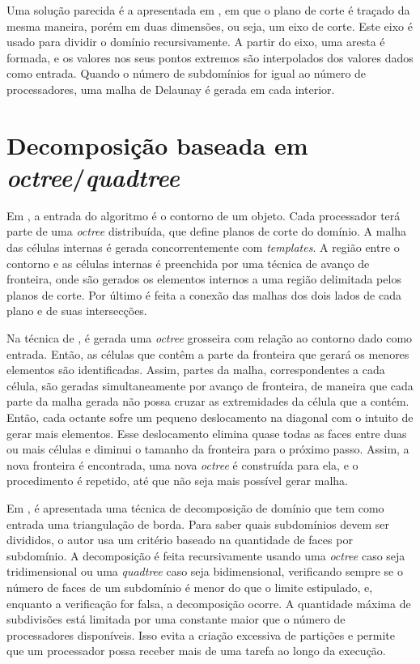 Uma solução parecida é a apresentada em \cite{bib:Lammer00}, em que o plano de corte é traçado da mesma maneira, porém em duas dimensões, ou seja, um eixo de corte. Este eixo é usado para dividir o domínio recursivamente. A partir do eixo, uma aresta é formada, e os valores nos seus pontos extremos são interpolados dos valores dados como entrada. Quando o número de subdomínios for igual ao número de processadores, uma malha de Delaunay é gerada em cada interior.

\section{Decomposição baseada em \textit{octree}/\textit{quadtree}}

Em \cite{bib:deCougny99}, a entrada do algoritmo é o contorno de um objeto. Cada processador terá parte de uma \textit{octree} distribuída, que define planos de corte do domínio. A malha das células internas é gerada concorrentemente com \textit{templates}. A região entre o contorno e as células internas é preenchida por uma técnica de avanço de fronteira, onde são gerados os elementos internos a uma região delimitada pelos planos de corte. Por último é feita a conexão das malhas dos dois lados de cada plano e de suas intersecções.

Na técnica de \cite{bib:Lohner01}, é gerada uma \textit{octree} grosseira com relação ao contorno dado como entrada. Então, as células que contêm a parte da fronteira que gerará os menores elementos são identificadas. Assim, partes da malha, correspondentes a cada célula, são geradas simultaneamente por avanço de fronteira, de maneira que cada parte da malha gerada não possa cruzar as extremidades da célula que a contém. Então, cada octante sofre um pequeno deslocamento na diagonal com o intuito de gerar mais elementos. Esse deslocamento elimina quase todas as faces entre duas ou mais células e diminui o tamanho da fronteira para o próximo passo. Assim, a nova fronteira é encontrada, uma nova \textit{octree} é construída para ela, e o procedimento é repetido, até que não seja mais possível gerar malha.

Em \cite{bib:Larwood03}, é apresentada uma técnica de decomposição de domínio que tem como entrada uma triangulação de borda. Para saber quais subdomínios devem ser divididos, o autor usa um critério baseado na quantidade de faces por subdomínio. A decomposição é feita recursivamente usando uma \textit{octree} caso seja tridimensional ou uma \textit{quadtree} caso seja bidimensional, verificando sempre se o número de faces de um subdomínio é menor do que o limite estipulado, e, enquanto a verificação for falsa, a decomposição ocorre. A quantidade máxima de subdivisões está limitada por uma constante maior que o número de processadores disponíveis. Isso evita a criação excessiva de partições e permite que um processador possa receber mais de uma tarefa ao longo da execução.

